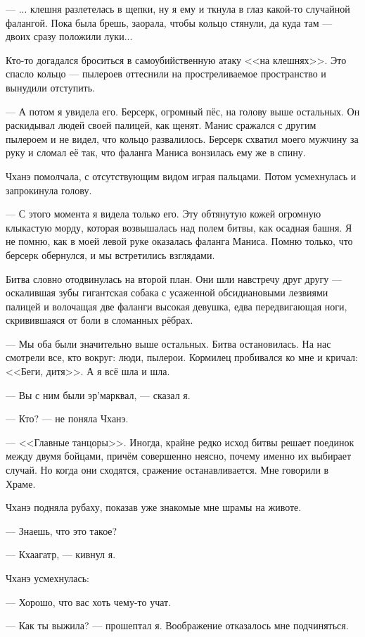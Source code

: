 --- ... клешня разлетелась в щепки, ну я ему и ткнула в глаз какой-то случайной фалангой.
Пока была брешь, заорала, чтобы кольцо стянули, да куда там --- двоих сразу положили луки...

Кто-то догадался броситься в самоубийственную атаку <<на клешнях>>.
Это спасло кольцо --- пылероев оттеснили на простреливаемое пространство и вынудили отступить.

--- А потом я увидела его.
Берсерк, огромный пёс, на голову выше остальных.
Он раскидывал людей своей палицей, как щенят.
Манис сражался с другим пылероем и не видел, что кольцо развалилось.
Берсерк схватил моего мужчину за руку и сломал её так, что фаланга Маниса вонзилась ему же в спину.

Чханэ помолчала, с отсутствующим видом играя пальцами.
Потом усмехнулась и запрокинула голову.

--- С этого момента я видела только его.
Эту обтянутую кожей огромную клыкастую морду, которая возвышалась над полем битвы, как осадная башня.
Я не помню, как в моей левой руке оказалась фаланга Маниса.
Помню только, что берсерк обернулся, и мы встретились взглядами.

Битва словно отодвинулась на второй план.
Они шли навстречу друг другу --- оскалившая зубы гигантская собака с усаженной обсидиановыми лезвиями палицей и волочащая две фаланги высокая девушка, едва передвигающая ноги, скривившаяся от боли в сломанных рёбрах.

--- Мы оба были значительно выше остальных. Битва остановилась. На нас смотрели
все, кто вокруг: люди, пылерои. Кормилец пробивался ко мне и кричал: <<Беги,
дитя>>. А я всё шла и шла.

--- Вы с ним были эр'марквал, --- сказал я.

--- Кто? --- не поняла Чханэ.

--- <<Главные танцоры>>.
Иногда, крайне редко исход битвы решает поединок между двумя бойцами, причём совершенно неясно, почему именно их выбирает случай.
Но когда они сходятся, сражение останавливается.
Мне говорили в Храме.

Чханэ подняла рубаху, показав уже знакомые мне шрамы на животе.

--- Знаешь, что это такое?

--- Кхаагатр, --- кивнул я.

Чханэ усмехнулась:

--- Хорошо, что вас хоть чему-то учат.

--- Как ты выжила? --- прошептал я.
Воображение отказалось мне подчиняться.

